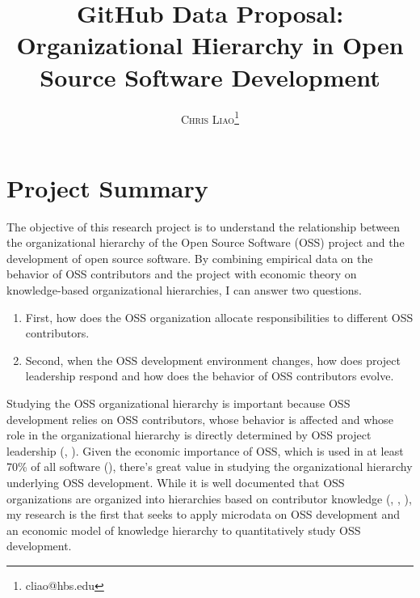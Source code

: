 \documentclass[12pt,notitlepage]{article}
\begin{document}
	
	\title{GitHub Data Proposal: Organizational Hierarchy in Open Source Software Development}
	\author{\textsc{Chris Liao}\footnote{cliao@hbs.edu}}
	
	\maketitle

\section*{Project Summary}
The objective of this research project is to understand the relationship between the organizational hierarchy of the Open Source Software (OSS) project and the development of open source software. By combining empirical data on the behavior of OSS contributors and the project with economic theory on knowledge-based organizational hierarchies, I can answer two questions. 
\begin{enumerate}
    \item First, how does the OSS organization allocate responsibilities to different OSS contributors.
    \item Second, when the OSS development environment changes, how does project leadership respond and how does the behavior of OSS contributors evolve. 
\end{enumerate} Studying the OSS organizational hierarchy is important because OSS development relies on OSS contributors, whose behavior is affected and whose role in the organizational hierarchy is directly determined by OSS project leadership (\cite{lerner_simple_2002}, \cite{lerner_economics_2005}). Given the economic importance of OSS, which is used in at least 70\% of all software (\cite{perlow_summary_2022}), there's great value in studying the organizational hierarchy underlying OSS development.  While it is well documented that OSS organizations are organized into hierarchies based on contributor knowledge (\cite{crowston_hierarchy_2006}, \cite{crowston_core_2006}, \cite{lerner_simple_2002}), my research is the first that seeks to apply microdata on OSS development and an economic model of knowledge hierarchy to quantitatively study OSS development.
\end{document}
